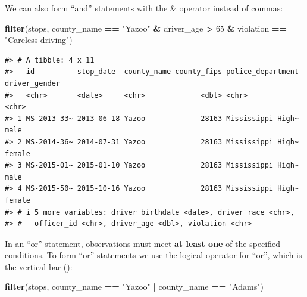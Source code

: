 \documentclass[
]{book}
\newenvironment{Shaded}{\begin{snugshade}}{\end{snugshade}}
\newcommand{\DecValTok}[1]{\textcolor[rgb]{0.00,0.00,0.81}{#1}}
\newcommand{\FunctionTok}[1]{\textcolor[rgb]{0.13,0.29,0.53}{\textbf{#1}}}
\newcommand{\NormalTok}[1]{#1}
\newcommand{\SpecialCharTok}[1]{\textcolor[rgb]{0.81,0.36,0.00}{\textbf{#1}}}
\newcommand{\StringTok}[1]{\textcolor[rgb]{0.31,0.60,0.02}{#1}}
\begin{document}
We can also form ``and'' statements with the \& operator instead of commas:

\begin{Shaded}
\begin{Highlighting}[]
\FunctionTok{filter}\NormalTok{(stops, county\_name }\SpecialCharTok{==} \StringTok{"Yazoo"} \SpecialCharTok{\&} 
\NormalTok{       driver\_age }\SpecialCharTok{\textgreater{}} \DecValTok{65} \SpecialCharTok{\&}
\NormalTok{       violation }\SpecialCharTok{==} \StringTok{"Careless driving"}\NormalTok{)}
\end{Highlighting}
\end{Shaded}

\begin{verbatim}
#> # A tibble: 4 x 11
#>   id          stop_date  county_name county_fips police_department driver_gender
#>   <chr>       <date>     <chr>             <dbl> <chr>             <chr>        
#> 1 MS-2013-33~ 2013-06-18 Yazoo             28163 Mississippi High~ male         
#> 2 MS-2014-36~ 2014-07-31 Yazoo             28163 Mississippi High~ female       
#> 3 MS-2015-01~ 2015-01-10 Yazoo             28163 Mississippi High~ male         
#> 4 MS-2015-50~ 2015-10-16 Yazoo             28163 Mississippi High~ female       
#> # i 5 more variables: driver_birthdate <date>, driver_race <chr>,
#> #   officer_id <chr>, driver_age <dbl>, violation <chr>
\end{verbatim}

In an ``or'' statement, observations must meet \textbf{at least one} of the specified conditions. To form ``or'' statements we use the logical operator for ``or'', which is the vertical bar (\textbar):

\begin{Shaded}
\begin{Highlighting}[]
\FunctionTok{filter}\NormalTok{(stops, county\_name }\SpecialCharTok{==} \StringTok{"Yazoo"} \SpecialCharTok{|}\NormalTok{ county\_name }\SpecialCharTok{==} \StringTok{"Adams"}\NormalTok{)}
\end{Highlighting}
\end{Shaded}
\end{document}
